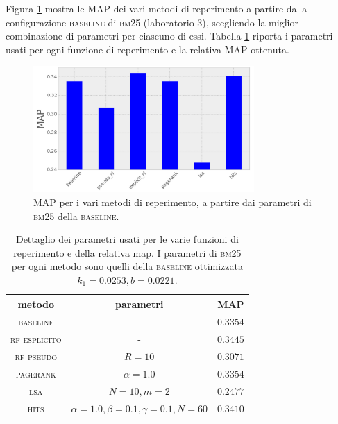 Figura \ref{fig:map_hist} mostra le MAP dei vari metodi di reperimento a partire dalla configurazione \textsc{baseline} di \textsc{bm25} (laboratorio 3), scegliendo la miglior combinazione di parametri per ciascuno di essi. Tabella \ref{tab:map} riporta i parametri usati per ogni funzione di reperimento e la relativa MAP ottenuta.
\begin{figure}[h]
	\begin{center}
		\includegraphics[width=0.75\textwidth]{figures/hist_map.png}
		\caption{MAP per i vari metodi di reperimento, a partire dai parametri di \textsc{bm25} della \textsc{baseline}.}
		\label{fig:map_hist}
	\end{center}
\end{figure}
\begin{table}[htpb]
	\begin{center}
		\begin{tabular}{|c|c|c|}
			\hline
			metodo & parametri & MAP \\
			\hline
			\textsc{baseline} & - & $0.3354$ \\
			\textsc{rf esplicito} & - & $0.3445$ \\
			\textsc{rf pseudo} & $R=10$ & $0.3071$ \\
			\textsc{pagerank} & $\alpha=1.0$ & $0.3354$ \\
			\textsc{lsa} & $N=10, m=2$ & $0.2477$ \\
			\textsc{hits} & $\alpha=1.0, \beta=0.1, \gamma=0.1, N=60$ & $0.3410$ \\
			\hline
		\end{tabular}
	\end{center}
	\caption{Dettaglio dei parametri usati per le varie funzioni di reperimento e della relativa map. I parametri di \textsc{bm25} per ogni metodo sono quelli della \textsc{baseline} ottimizzata $k_1 = 0.0253, b = 0.0221$.}
	\label{tab:map}
\end{table}

